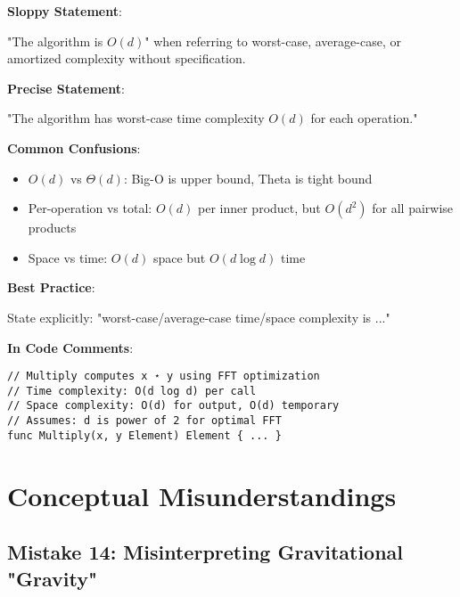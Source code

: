 \begin{warning}
\textbf{Sloppy Statement}:

"The algorithm is $O(d)$" when referring to worst-case, average-case, or amortized complexity without specification.

\textbf{Precise Statement}:

"The algorithm has worst-case time complexity $O(d)$ for each operation."

\textbf{Common Confusions}:

\begin{itemize}
\item $O(d)$ vs $\Theta(d)$: Big-O is upper bound, Theta is tight bound
\item Per-operation vs total: $O(d)$ per inner product, but $O(d^2)$ for all pairwise products
\item Space vs time: $O(d)$ space but $O(d \log d)$ time
\end{itemize}

\textbf{Best Practice}:

State explicitly: "worst-case/average-case time/space complexity is ..."

\textbf{In Code Comments}:

\begin{lstlisting}[style=golang]
// Multiply computes x ⋆ y using FFT optimization
// Time complexity: O(d log d) per call
// Space complexity: O(d) for output, O(d) temporary
// Assumes: d is power of 2 for optimal FFT
func Multiply(x, y Element) Element { ... }
\end{lstlisting}
\end{warning}

\section{Conceptual Misunderstandings}

\subsection{Mistake 14: Misinterpreting Gravitational "Gravity"}

